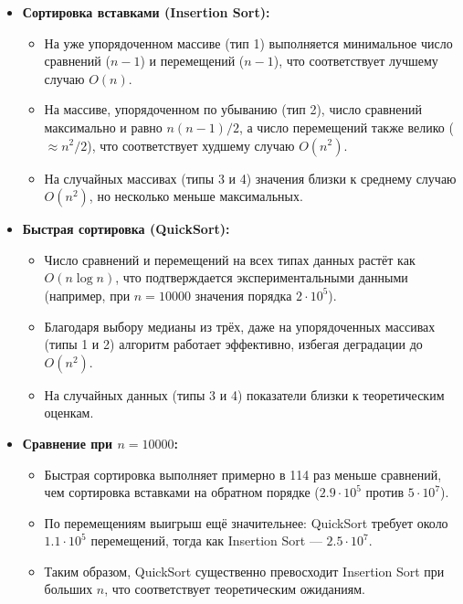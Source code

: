 \documentclass[a4paper,12pt,titlepage,finall]{article}
\begin{document}
\begin{itemize}
    \item \textbf{Сортировка вставками (Insertion Sort):} 
        \begin{itemize}
            \item На уже упорядоченном массиве (тип 1) выполняется минимальное число сравнений (\(n-1\)) и перемещений (\(n-1\)), что соответствует лучшему случаю \(O(n)\).
            \item На массиве, упорядоченном по убыванию (тип 2), число сравнений максимально и равно \(n(n-1)/2\), а число перемещений также велико (\(\approx n^2/2\)), что соответствует худшему случаю \(O(n^2)\).
            \item На случайных массивах (типы 3 и 4) значения близки к среднему случаю \(O(n^2)\), но несколько меньше максимальных.
        \end{itemize}
    \item \textbf{Быстрая сортировка (QuickSort):}
        \begin{itemize}
            \item Число сравнений и перемещений на всех типах данных растёт как \(O(n \log n)\), что подтверждается экспериментальными данными (например, при \(n=10000\) значения порядка \(2\cdot10^5\)).
            \item Благодаря выбору медианы из трёх, даже на упорядоченных массивах (типы 1 и 2) алгоритм работает эффективно, избегая деградации до \(O(n^2)\).
            \item На случайных данных (типы 3 и 4) показатели близки к теоретическим оценкам.
        \end{itemize}
    \item \textbf{Сравнение при \(n=10000\):}
        \begin{itemize}
            \item Быстрая сортировка выполняет примерно в 114 раз меньше сравнений, чем сортировка вставками на обратном порядке (\(2.9\cdot10^5\) против \(5\cdot10^7\)).
            \item По перемещениям выигрыш ещё значительнее: QuickSort требует около \(1.1\cdot10^5\) перемещений, тогда как Insertion Sort — \(2.5\cdot10^7\).
            \item Таким образом, QuickSort существенно превосходит Insertion Sort при больших \(n\), что соответствует теоретическим ожиданиям.
        \end{itemize}
\end{itemize}
\end{document}
